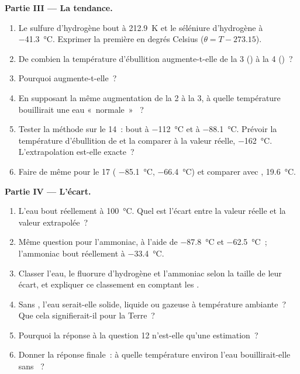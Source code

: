 \begin{problem}
\medskip
\noindent\textbf{Partie III --- La tendance.}
\begin{enumerate}[resume]
  \item Le sulfure d'hydrogène bout à \qty{212.9}{K} et le séléniure
        d'hydrogène à \qty{-41.3}{\celsius}. Exprimer la
        première en degrés Celsius ($\theta = T - 273.15$).
  \item De combien la température d'ébullition augmente-t-elle de la
         3 () à la  4 ()~?
  \item Pourquoi augmente-t-elle~?
  \item En supposant la même augmentation de la  2 à la
         3, à quelle température bouillirait une eau «~normale~»
        ~?
  \item Tester la méthode sur le  14~:  bout à
        \qty{-112}{\celsius} et  à \qty{-88.1}{\celsius}.
        Prévoir la température d'ébullition de  et la comparer à
        la valeur réelle, \qty{-162}{\celsius}. L'extrapolation est-elle
        exacte~?
  \item Faire de même pour le  17 ( \qty{-85.1}{\celsius},
         \qty{-66.4}{\celsius}) et comparer avec ,
        \qty{19.6}{\celsius}.
\end{enumerate}

\medskip
\noindent\textbf{Partie IV --- L'écart.}
\begin{enumerate}[resume]
  \item L'eau bout réellement à \qty{100}{\celsius}. Quel est l'écart
        entre la valeur réelle et la valeur extrapolée~?
  \item Même question pour l'ammoniac, à l'aide de 
        \qty{-87.8}{\celsius} et  \qty{-62.5}{\celsius}~;
        l'ammoniac bout réellement à \qty{-33.4}{\celsius}.
  \item Classer l'eau, le fluorure d'hydrogène et l'ammoniac selon la
        taille de leur écart, et expliquer ce classement en comptant les
        .
  \item Sans , l'eau serait-elle solide, liquide ou
        gazeuse à température ambiante~? Que cela signifierait-il pour la
        Terre~?
  \item Pourquoi la réponse à la question 12 n'est-elle qu'une
        estimation~?
  \item Donner la réponse finale~: à quelle température environ l'eau
        bouillirait-elle sans ~?
\end{enumerate}
\end{problem}
